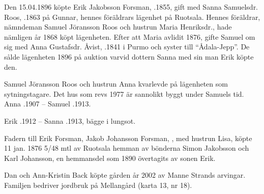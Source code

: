 %
Den 15.04.1896 köpte Erik Jakobsson Forsman, .1855, gift med Sanna Samuelsdr. Roos, .1863 på Gunnar, hennes föräldrars lägenhet på Ruotsala. Hennes föräldrar, nämndeman  Samuel Jöransson Roos och hustrun Maria Henriksdr., hade nämligen år 1868 köpt lägenheten. Efter att Maria avlidit 1876, gifte Samuel om sig med Anna Gustafsdr. Åvist, .1841 i Purmo och syster till ``Ådala-Jepp''. De sålde lägenheten 1896 på auktion varvid  dottern Sanna med sin man Erik köpte den.
\begin{jhchildren}
  \item {}
  \item {}
  \item {}
  \item {}
  \item {}
  \item {}
\end{jhchildren}

Samuel Jöransson Roos och hustrun Anna kvarlevde på lägenheten som sytningstagare. Det hus som revs 1977 är sannolikt byggt under Samuels tid. Anna .1907  --  Samuel .1913.

Erik .1912  --  Sanna .1913, bägge i lungsot.


%
Fadern till Erik Forsman, Jakob Johansson Forsman, , med hustrun Lisa,  köpte 11 jan. 1876  5/48 mtl av Ruotsala hemman av bönderna Simon Jakobsson och Karl Johansson, en hemmansdel som 1890 övertagits av sonen Erik.\jhvspace{}



%



%
Dan och Ann-Kristin Back köpte gården år 2002 av Manne Strands arvingar. Familjen bedriver jordbruk på Mellangård (karta 13, nr 18).\jhvspace{}


